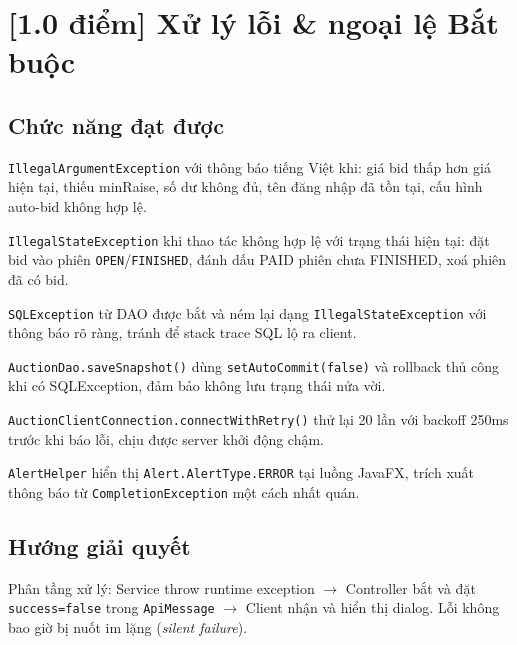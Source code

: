 \documentclass[12pt,a4paper]{article}
\newcommand{\score}[1]{\textbf{[#1 điểm]}}
\newcommand{\mandatory}{\textcolor{mandatorycolor}{\textbf{Bắt buộc}}}
\newcommand{\filepath}[1]{\texttt{\small #1}}
\begin{document}
\section{\score{1.0} Xử lý lỗi \& ngoại lệ \hfill \mandatory}

\subsection*{Chức năng đạt được}

\begin{description}[leftmargin=2em, style=nextline]
  \item[\textbf{Validation đầu vào}]
    \texttt{IllegalArgumentException} với thông báo tiếng Việt khi: giá bid thấp hơn giá hiện tại, thiếu minRaise, số dư không đủ, tên đăng nhập đã tồn tại, cấu hình auto-bid không hợp lệ.

  \item[\textbf{Kiểm tra trạng thái}]
    \texttt{IllegalStateException} khi thao tác không hợp lệ với trạng thái hiện tại: đặt bid vào phiên \texttt{OPEN}/\texttt{FINISHED}, đánh dấu PAID phiên chưa FINISHED, xoá phiên đã có bid.

  \item[\textbf{Database error wrapping}]
    \texttt{SQLException} từ DAO được bắt và ném lại dạng \texttt{IllegalStateException} với thông báo rõ ràng, tránh để stack trace SQL lộ ra client.

  \item[\textbf{Transaction rollback}]
    \filepath{AuctionDao.saveSnapshot()} dùng \texttt{setAutoCommit(false)} và rollback thủ công khi có SQLException, đảm bảo không lưu trạng thái nửa vời.

  \item[\textbf{Network retry}]
    \filepath{AuctionClientConnection.connectWithRetry()} thử lại 20 lần với backoff 250ms trước khi báo lỗi, chịu được server khởi động chậm.

  \item[\textbf{UI error dialog}]
    \filepath{AlertHelper} hiển thị \texttt{Alert.AlertType.ERROR} tại luồng JavaFX, trích xuất thông báo từ \texttt{CompletionException} một cách nhất quán.
\end{description}

\subsection*{Hướng giải quyết}
Phân tầng xử lý: Service throw runtime exception $\to$ Controller bắt và đặt \texttt{success=false} trong \texttt{ApiMessage} $\to$ Client nhận và hiển thị dialog. Lỗi không bao giờ bị nuốt im lặng (\textit{silent failure}).
\end{document}
